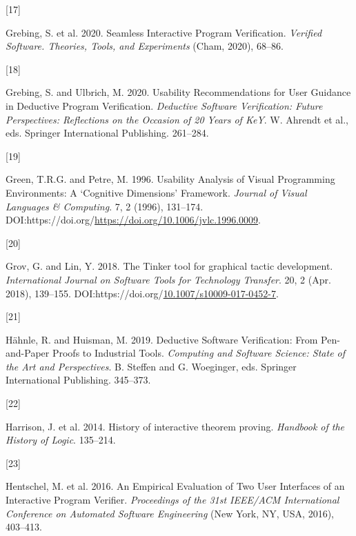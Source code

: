 \documentclass[
]{article}
\newlength{\cslhangindent}
\newlength{\csllabelwidth}
\newlength{\cslentryspacingunit} %
\newenvironment{CSLReferences}[2] %
 {%
  \setlength{\parindent}{0pt}
  \ifodd #1
  \let\oldpar\par
  \def\par{\hangindent=\cslhangindent\oldpar}
  \fi
  \setlength{\parskip}{#2\cslentryspacingunit}
 }%
 {}
\newcommand{\CSLLeftMargin}[1]{\parbox[t]{\csllabelwidth}{#1}}
\newcommand{\CSLRightInline}[1]{\parbox[t]{\linewidth - \csllabelwidth}{#1}\break}
\begin{document}
\begin{CSLReferences}{0}{0}
\leavevmode{}%
\CSLLeftMargin{{[}17{]} }
\CSLRightInline{Grebing, S. et al. 2020. Seamless {Interactive}
{Program} {Verification}. \emph{Verified {Software}. {Theories},
{Tools}, and {Experiments}} (Cham, 2020), 68--86.}

\leavevmode{}%
\CSLLeftMargin{{[}18{]} }
\CSLRightInline{Grebing, S. and Ulbrich, M. 2020. Usability
{Recommendations} for {User} {Guidance} in {Deductive} {Program}
{Verification}. \emph{Deductive {Software} {Verification}: {Future}
{Perspectives}: {Reflections} on the {Occasion} of 20 {Years} of {KeY}}.
W. Ahrendt et al., eds. Springer International Publishing. 261--284.}

\leavevmode{}%
\CSLLeftMargin{{[}19{]} }
\CSLRightInline{Green, T.R.G. and Petre, M. 1996. Usability {Analysis}
of {Visual} {Programming} {Environments}: {A} {`{Cognitive}
{Dimensions}'} {Framework}. \emph{Journal of Visual Languages \&
Computing}. 7, 2 (1996), 131--174.
DOI:https://doi.org/\url{https://doi.org/10.1006/jvlc.1996.0009}.}

\leavevmode{}%
\CSLLeftMargin{{[}20{]} }
\CSLRightInline{Grov, G. and Lin, Y. 2018. The {Tinker} tool for
graphical tactic development. \emph{International Journal on Software
Tools for Technology Transfer}. 20, 2 (Apr. 2018), 139--155.
DOI:https://doi.org/\href{https://doi.org/10.1007/s10009-017-0452-7}{10.1007/s10009-017-0452-7}.}

\leavevmode{}%
\CSLLeftMargin{{[}21{]} }
\CSLRightInline{Hähnle, R. and Huisman, M. 2019. Deductive {Software}
{Verification}: {From} {Pen}-and-{Paper} {Proofs} to {Industrial}
{Tools}. \emph{Computing and {Software} {Science}: {State} of the {Art}
and {Perspectives}}. B. Steffen and G. Woeginger, eds. Springer
International Publishing. 345--373.}

\leavevmode{}%
\CSLLeftMargin{{[}22{]} }
\CSLRightInline{Harrison, J. et al. 2014. History of interactive theorem
proving. \emph{Handbook of the History of Logic}. 135--214.}

\leavevmode{}%
\CSLLeftMargin{{[}23{]} }
\CSLRightInline{Hentschel, M. et al. 2016. An {Empirical} {Evaluation}
of {Two} {User} {Interfaces} of an {Interactive} {Program} {Verifier}.
\emph{Proceedings of the 31st {IEEE}/{ACM} {International} {Conference}
on {Automated} {Software} {Engineering}} (New York, NY, USA, 2016),
403--413.}


\end{CSLReferences}
\end{document}
